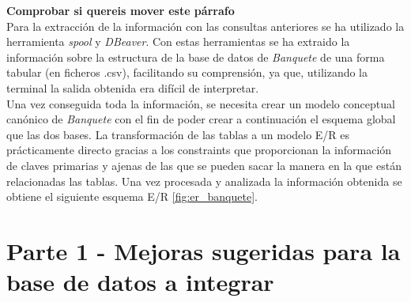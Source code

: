 \documentclass{article}
\begin{document}
\textbf{Comprobar si quereis mover este párrafo}\\
Para la extracción de la información con las consultas anteriores se ha utilizado la herramienta \emph{spool} y \emph{DBeaver}. Con estas herramientas se ha extraido la información sobre la estructura de la base de datos de \emph{Banquete} de una forma tabular (en ficheros .csv), facilitando su comprensión, ya que, utilizando la terminal la salida obtenida era difícil de interpretar.\\

Una vez conseguida toda la información, se necesita crear un modelo conceptual canónico de \emph{Banquete} con el fin de poder crear a continuación el esquema global que las dos bases. La transformación de las tablas a un modelo E/R es prácticamente directo gracias a los constraints que proporcionan la información de claves primarias y ajenas de las que se pueden sacar la manera en la que están relacionadas las tablas. Una vez procesada y analizada la información obtenida se obtiene el siguiente esquema E/R \ref{fig:er_banquete}.

\section{Parte 1 - Mejoras sugeridas para la base de datos a integrar}
\end{document}
